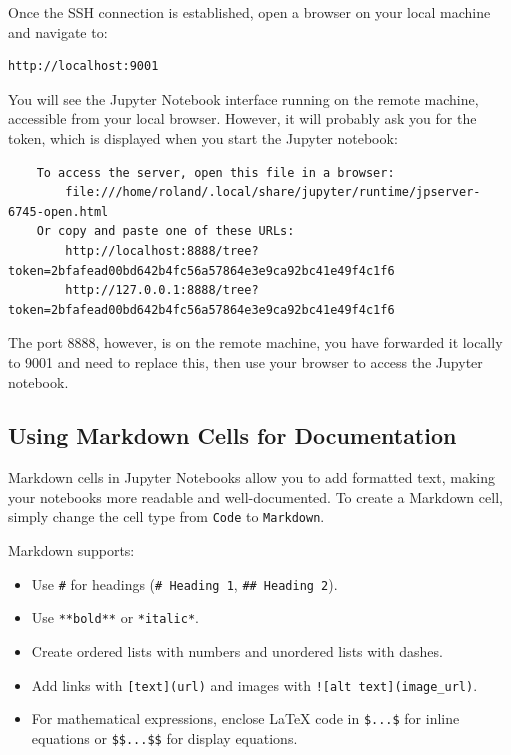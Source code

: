 Once the SSH connection is established, open a browser on your local machine and navigate to:
\begin{verbatim}
http://localhost:9001
\end{verbatim}

You will see the Jupyter Notebook interface running on the remote machine, accessible from your local browser. However, it will probably ask you for the token, which is displayed when you start the Jupyter notebook: 

\begin{lstlisting}
    To access the server, open this file in a browser:
        file:///home/roland/.local/share/jupyter/runtime/jpserver-6745-open.html
    Or copy and paste one of these URLs:
        http://localhost:8888/tree?token=2bfafead00bd642b4fc56a57864e3e9ca92bc41e49f4c1f6
        http://127.0.0.1:8888/tree?token=2bfafead00bd642b4fc56a57864e3e9ca92bc41e49f4c1f6
\end{lstlisting}

The port 8888, however, is on the remote machine, you have forwarded it locally to 9001 and need to replace this, then use your browser to access the Jupyter notebook. 

%
\subsection{Using Markdown Cells for Documentation}

Markdown cells in Jupyter Notebooks allow you to add formatted text, making your notebooks more readable and well-documented. To create a Markdown cell, simply change the cell type from \texttt{Code} to \texttt{Markdown}.

Markdown supports:
\begin{itemize}
    \item {} Use \texttt{\#} for headings (\texttt{\# Heading 1}, \texttt{\#\# Heading 2}).
    \item {} Use \texttt{**bold**} or \texttt{*italic*}.
    \item {} Create ordered lists with numbers and unordered lists with dashes.
    \item {} Add links with \texttt{[text](url)} and images with \texttt{![alt text](image\_url)}.
    \item {} For mathematical expressions, enclose LaTeX code in \texttt{\$...\$} for inline equations or \texttt{\$\$...\$\$} for display equations.
\end{itemize}

